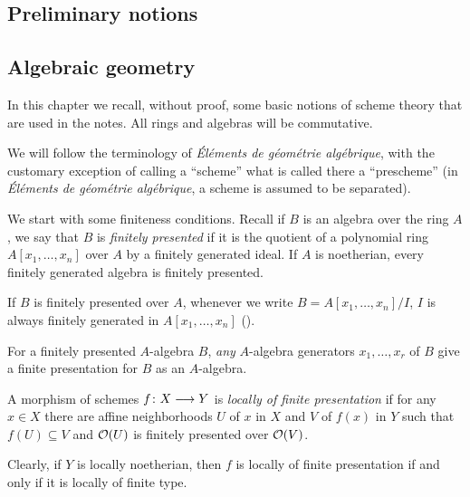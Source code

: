 \begin{1   PRELIMINARY NOTIONS}
\setcounter{chapter}{0}
\chapter{Preliminary notions} \label{ch:recall}
\begin{1.1 Algebraic geometry}
\setcounter{section}{0}
\section{Algebraic geometry}

In this chapter we recall, without proof, some basic notions of scheme theory that are used in the notes. All rings and algebras will be commutative.

We will follow the terminology of \emph{\'{E}l\'ements de g\'eom\'etrie alg\'ebrique}, with the customary exception of calling a ``scheme'' what is called there a ``prescheme'' (in \emph{\'{E}l\'ements de g\'eom\'etrie alg\'ebrique}, a scheme is assumed to be separated).

We start with some finiteness conditions. Recall if $B$ is an algebra over the ring $A$, we say that $B$ is \emph{finitely presented} if it is the quotient of a polynomial ring $A[x_1, \dots, x_n]$ over $A$ by a finitely generated ideal. If $A$ is noetherian, every finitely generated algebra is finitely presented.

If $B$ is finitely presented over $A$, whenever we write $B = A[x_1, \dots, x_n]/I$, $I$ is always finitely generated in $A[x_1, \dots, x_n]$ (\cite[Proposition~1.4.4]{ega4-1}).
\begin{shaded}
For a finitely presented $A$-algebra $B$, \emph{any} $A$-algebra generators $x_1,\ldots,x_r$ of $B$ give a finite presentation for $B$ as an $A$-algebra.
\end{shaded}


\begin{definition}
A morphism of schemes $f \colon X \arr Y$ is \emph{locally of finite presentation}
if for any $x \in X$ there are affine neighborhoods $U$ of $x$ in $X$ and $V$ of $f(x)$ in $Y$ such that $f(U) \subseteq V$ and $\mathcal{O}(U)$ is finitely presented over $\mathcal{O}(V)$.
\end{definition}

Clearly, if $Y$ is locally noetherian, then $f$ is locally of finite presentation if and only if it is locally of finite type.


\end{1.1 Algebraic geometry}
\end{1   PRELIMINARY NOTIONS}
